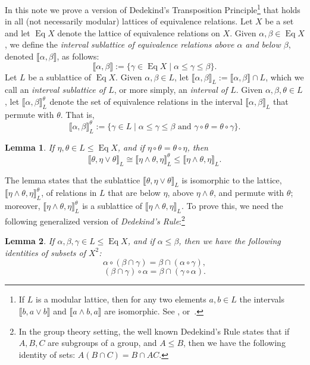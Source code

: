 \documentclass[11pt,reqno]{amsart}
\theoremstyle{plain}
\newtheorem{lemma}{Lemma}
\theoremstyle{definition}
\theoremstyle{remark}
\newtheorem*{remarks}{Remarks}
\newcommand{\<}{\ensuremath{\langle}}
\renewcommand{\>}{\ensuremath{\rangle}}
\newcommand{\lb}{\ensuremath{\llbracket}}
\newcommand{\rb}{\ensuremath{\rrbracket}}
\renewcommand{\leq}{\ensuremath{\leqslant}}
\newcommand{\meet}{\ensuremath{\wedge}}
\newcommand{\join}{\ensuremath{\vee}}
\newcommand{\Eq}{\ensuremath{\operatorname{Eq}}}
\begin{document}
In this note we prove a version of Dedekind's Transposition
Principle\footnote{If $L$ is a modular lattice, then for any two elements $a, b\in L$
the intervals $\lb b, a\join b\rb$ and $\lb a\meet b, a\rb$ are isomorphic.
 See \cite{Dedekind:1900}, or~\cite[page 57]{alvi:1987}.} that
holds in all (not necessarily modular) lattices of equivalence 
relations.
Let $X$ be a set and let $\Eq X$ denote the lattice of equivalence relations on $X$.  Given $\alpha,
\beta \in \Eq X$, we define the
\emph{interval sublattice of equivalence relations above $\alpha$ and below
  $\beta$}, denoted $\lb \alpha, \beta \rb$, as follows:
\[
\lb \alpha, \beta\rb:= \{\gamma \in \Eq X \mid \alpha \leq \gamma \leq \beta\}.
\]
Let $L$ be a sublattice of $\Eq X$.  Given $\alpha,
\beta \in L$, let $\lb \alpha, \beta \rb_L:= \lb \alpha, \beta \rb \cap L$,
which we call an \emph{interval sublattice of $L$}, or more simply, an \emph{interval of $L$}.
Given 
$\alpha, \beta, \theta \in L$, let  $\lb \alpha, \beta \rb_L^\theta$ denote the
set of equivalence relations in the interval $\lb \alpha, \beta \rb_L$  that permute with
$\theta$.  That is, 
\[
\lb \alpha, \beta \rb_L^\theta:= \{\gamma \in L \mid \alpha \leq \gamma \leq
\beta \text{ and } \gamma \circ \theta = \theta \circ \gamma\}.
\]
\begin{lemma}
\label{lem:1}
If $\eta, \theta \in L\leq \Eq X$, and if $\eta\circ \theta = \theta \circ \eta$, then
\[\lb\theta, \eta \join \theta\rb_L \cong \lb\eta \meet \theta, \eta\rb_L^\theta \leq 
\lb\eta \meet \theta, \eta\rb_L.
\]
\end{lemma}
The lemma states that the sublattice $\lb\theta, \eta \join \theta\rb_L$ is isomorphic to the 
lattice, $\lb\eta \meet \theta, \eta\rb_L^\theta$, of relations in $L$ that are below
$\eta$, above $\eta \meet \theta$, and permute with $\theta$; moreover, $\lb\eta \meet \theta,
\eta\rb_L^\theta$ is a sublattice of
$\lb\eta \meet \theta, \eta\rb_L$.
To prove this, we need the following generalized version of \emph{Dedekind's 
Rule}:\footnote{In the group theory setting, the well known Dedekind's
  Rule states that if $A, B, C$ are subgroups of a group,
  and $A\leq B$, then we have the following identity of sets: $A(B\cap C) = B
  \cap AC$.}
\begin{lemma}
\label{lem:dedekind}
If $\alpha, \beta, \gamma \in L \leq \Eq X$, and if $\alpha
\leq \beta$, then we have the following identities of subsets of $X^2$:
\begin{equation}
  \label{eq:1}
  \alpha \circ (\beta \cap \gamma) = \beta \cap (\alpha \circ \gamma),
\end{equation}
\begin{equation}
  \label{eq:2}
  (\beta \cap \gamma) \circ \alpha = \beta \cap (\gamma \circ \alpha).
\end{equation}
\end{lemma}
\end{document}
